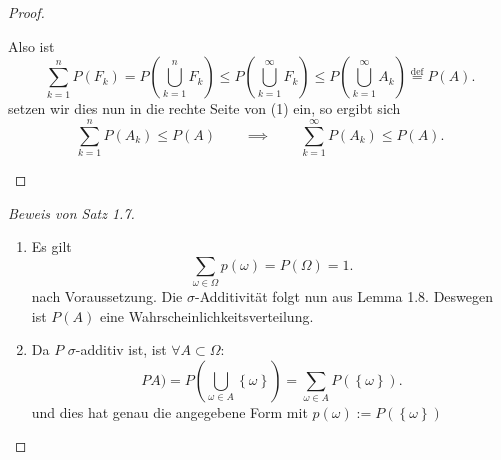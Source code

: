 \begin{proof}
\begin{enumerate}[label=\protect\circled{\alph*}]
\begin{enumerate}[1)]
\begin{equation}
                    \end{equation}
                    Also ist
                    \[
                        \sum_{k=1}^n P(F_k) = P\left( \bigcup_{k=1}^n F_k \right) \leq P\left( \bigcup_{k=1}^{\infty}F_k \right) \leq P\left( \bigcup_{k=1}^{\infty}A_k \right)  \stackrel{\text{def}}{=} P(A)
                    .\] 
                    setzen wir dies nun in die rechte Seite von (1) ein, so ergibt sich
                    \[
                        \sum_{k=1}^n P(A_k) \leq  P(A) \qquad \implies \qquad \sum_{k=1}^{\infty} P(A_k) \leq  P(A)
                    .\] 
            \end{enumerate}
    \end{enumerate}
\end{proof}
\begin{proof}[Beweis von Satz 1.7]
    \begin{enumerate}[label=\protect\circled{\alph*}]
        \item Es gilt
            \[
                \sum_{\omega\in \Omega}p(\omega) = P(\Omega) = 1
            .\] 
            nach Voraussetzung. Die $\sigma$-Additivität folgt nun aus Lemma 1.8. Deswegen ist $P(A)$ eine Wahrscheinlichkeitsverteilung.
        \item Da $P$ $\sigma$-additiv ist, ist $\forall A \subset \Omega$:
            \[
                PA) = P\left(\bigcup_{\omega\in A} \left \{\omega\right\} \right) = \sum_{\omega\in A} P(\left \{\omega\right\} )
            .\] 
            und dies hat genau die angegebene Form mit $p(\omega) := P(\left \{\omega\right\} )$
    \end{enumerate}
\end{proof}


